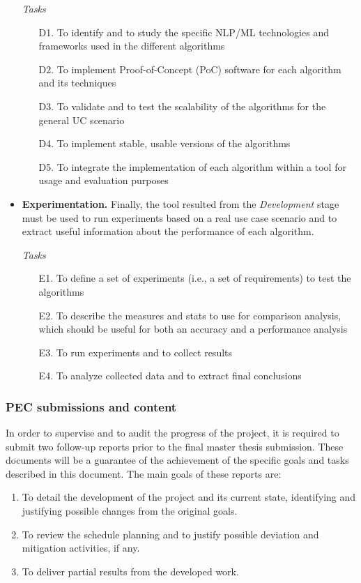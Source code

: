 \documentclass[11pt]{article}
\begin{document}
\begin{itemize}
\textit{Tasks}
\begin{enumerate}
\item[D1.] To identify and to study the specific NLP/ML technologies and frameworks used in the different algorithms
\item[D2.] To implement Proof-of-Concept (PoC) software for each algorithm and its techniques
\item[D3.] To validate and to test the scalability of the algorithms for the general UC scenario
\item[D4.] To implement stable, usable versions of the algorithms
\item[D5.] To integrate the implementation of each algorithm within a tool for usage and evaluation purposes
\end{enumerate}
\item \textbf{Experimentation.} Finally, the tool resulted from the \textit{Development} stage must be used to run experiments based on a real use case scenario and to extract useful information about the performance of each algorithm.

\textit{Tasks}
\begin{enumerate}
\item[E1.] To define a set of experiments (i.e., a set of requirements) to test the algorithms
\item[E2.] To describe the measures and stats to use for comparison analysis, which should be useful for both an accuracy and a performance analysis
\item[E3.] To run experiments and to collect results
\item[E4.] To analyze collected data and to extract final conclusions
\end{enumerate}
\end{itemize}

\subsubsection{PEC submissions and content}

In order to supervise and to audit the progress of the project, it is required to submit two follow-up reports prior to the final master thesis submission. These documents will be a guarantee of the achievement of the specific goals and tasks described in this document. The main goals of these reports are:

\begin{enumerate}
\item To detail the development of the project and its current state, identifying and justifying possible changes from the original goals.
\item To review the schedule planning and to justify possible deviation and mitigation activities, if any.
\item To deliver partial results from the developed work.
\end{enumerate}
\end{document}
